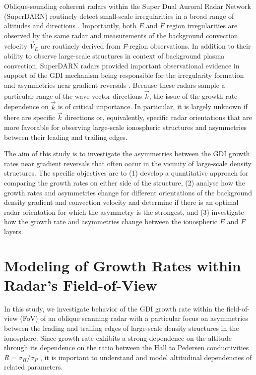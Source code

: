 Oblique-sounding coherent radars within the Super Dual Auroral Radar Network (SuperDARN) routinely detect small-scale irregularities in a broad range of altitudes and directions \citep{Chisham2007}. Importantly, both \(E\) and \(F\) region irregularities are observed by the same radar \citep[e.g. recent papers by][]{Lamarche2015,Forsythe2015} and measurements of the background convection velocity \(\vec{V}_E\) are routinely derived from \(F\)-region observations. In addition to their ability to observe large-scale structures in context of background plasma convection, SuperDARN radars provided important observational evidence in support of the GDI mechanism being responsible for the irregularity formation and asymmetries near gradient reversals \citep{Milan2002a,Koustov2012}. Because these radars sample a particular range of the wave vector directions \(\vec{k}\), the issue of the growth rate dependence on \(\vec{k}\) is of critical importance. In particular, it is largely unknown if there are specific \(\vec{k}\) directions or, equivalently, specific radar orientations that are more favorable for observing large-scale ionospheric structures and asymmetries between their leading and trailing edges.



The aim of this study is to investigate the asymmetries between the GDI growth rates near gradient reversals that often occur in the vicinity of large-scale density structures. The specific objectives are to (1) develop a quantitative approach for comparing the growth rates on either side of the structure,  (2) analyse how the growth rates and asymmetries change for different orientations of the background density gradient and convection velocity and determine if there is an optimal radar orientation for which the asymmetry is the strongest, and (3) investigate how the growth rate and asymmetries change between the ionospheric \(E\) and \(F\) layers.


\section{Modeling of Growth Rates within Radar's Field-of-View}
\label{sec:model_fov}
In this study, we investigate behavior of the GDI growth rate within the field-of-view (FoV) of an oblique scanning radar with a particular focus on asymmetries between the leading and trailing edges of large-scale density structures in the ionosphere. Since growth rate exhibits a strong dependence on the altitude through its dependence on the ratio between the Hall to Pedersen conductivities \(R=\sigma_H/\sigma_P\) \citep{Makarevich2014c}, it is important to understand and model altitudinal dependencies of related parameters.

